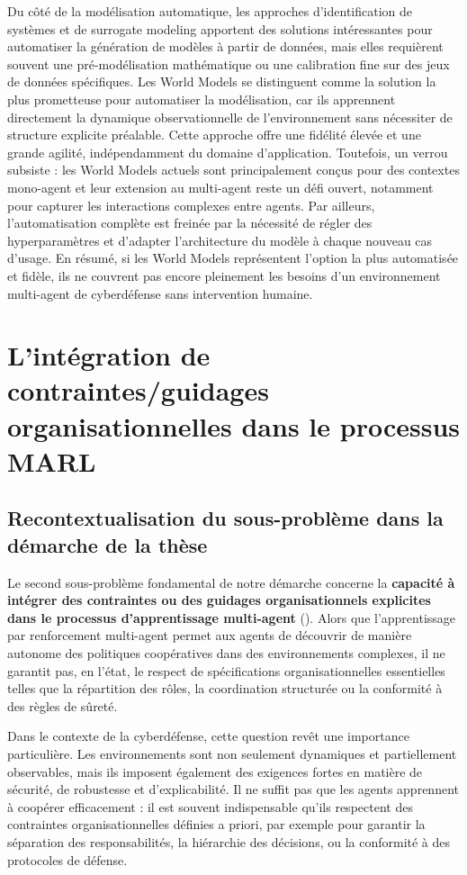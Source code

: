 Du côté de la modélisation automatique, les approches d’identification de systèmes et de surrogate modeling apportent des solutions intéressantes pour automatiser la génération de modèles à partir de données, mais elles requièrent souvent une pré-modélisation mathématique ou une calibration fine sur des jeux de données spécifiques. Les World Models se distinguent comme la solution la plus prometteuse pour automatiser la modélisation, car ils apprennent directement la dynamique observationnelle de l’environnement sans nécessiter de structure explicite préalable. Cette approche offre une fidélité élevée et une grande agilité, indépendamment du domaine d’application. Toutefois, un verrou subsiste : les World Models actuels sont principalement conçus pour des contextes mono-agent et leur extension au multi-agent reste un défi ouvert, notamment pour capturer les interactions complexes entre agents. Par ailleurs, l’automatisation complète est freinée par la nécessité de régler des hyperparamètres et d’adapter l’architecture du modèle à chaque nouveau cas d’usage. En résumé, si les World Models représentent l’option la plus automatisée et fidèle, ils ne couvrent pas encore pleinement les besoins d’un environnement multi-agent de cyberdéfense sans intervention humaine.

\section{L'intégration de contraintes/guidages organisationnelles dans le processus MARL}

\subsection*{Recontextualisation du sous-problème dans la démarche de la thèse}

Le second sous-problème fondamental de notre démarche concerne la \textbf{capacité à intégrer des contraintes ou des guidages organisationnels explicites dans le processus d'apprentissage multi-agent} (). Alors que l'apprentissage par renforcement multi-agent permet aux agents de découvrir de manière autonome des politiques coopératives dans des environnements complexes, il ne garantit pas, en l'état, le respect de spécifications organisationnelles essentielles telles que la répartition des rôles, la coordination structurée ou la conformité à des règles de sûreté.

Dans le contexte de la cyberdéfense, cette question revêt une importance particulière. Les environnements sont non seulement dynamiques et partiellement observables, mais ils imposent également des exigences fortes en matière de sécurité, de robustesse et d'explicabilité. Il ne suffit pas que les agents apprennent à coopérer efficacement : il est souvent indispensable qu'ils respectent des contraintes organisationnelles définies a priori, par exemple pour garantir la séparation des responsabilités, la hiérarchie des décisions, ou la conformité à des protocoles de défense.

